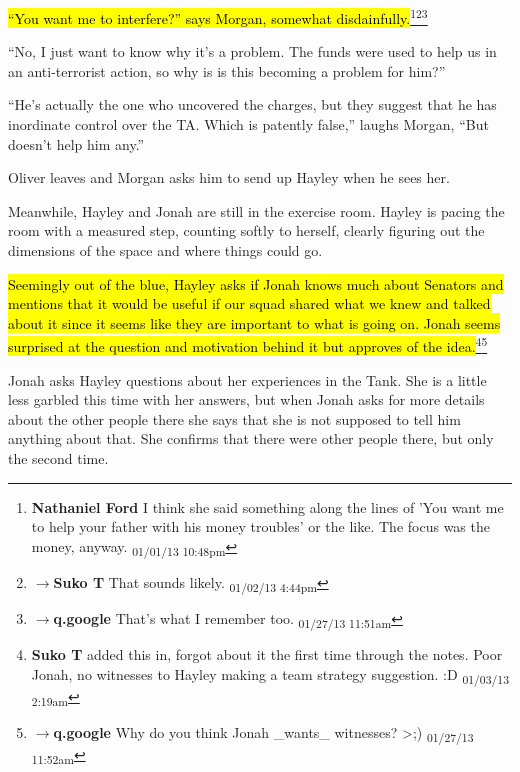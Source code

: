\hl{``You want me to interfere?'' says Morgan, somewhat disdainfully.}\footnote{\textbf{Nathaniel Ford }I think she said something along the lines of 'You want me to help your father with his money troubles' or the like. The focus was the money, anyway. \textsubscript{01/01/13 10:48pm}}\footnote{$\rightarrow$\textbf{Suko T }That sounds likely. \textsubscript{01/02/13 4:44pm}}\footnote{$\rightarrow$\textbf{q.google }That's what I remember too. \textsubscript{01/27/13 11:51am}}

``No, I just want to know why it's a problem.  The funds were used to help us in an anti-terrorist action, so why is is this becoming a problem for him?''

``He's actually the one who uncovered the charges, but they suggest that he has inordinate control over the TA.  Which is patently false,'' laughs Morgan, ``But doesn't help him any.''  



Oliver leaves and Morgan asks him to send up Hayley when he sees her.



Meanwhile, Hayley and Jonah are still in the exercise room.  Hayley is pacing the room with a measured step, counting softly to herself, clearly figuring out the dimensions of the space and where things could go.  



\hl{Seemingly out of the blue, Hayley asks if Jonah knows much about Senators and mentions that it would be useful if our squad shared what we knew and talked about it since it seems like they are important to what is going on.  Jonah seems surprised at the question and motivation behind it but approves of the idea.}\footnote{\textbf{Suko T }added this in, forgot about it the first time through the notes.  Poor Jonah, no witnesses to Hayley making a team strategy suggestion. :D \textsubscript{01/03/13 2:19am}}\footnote{$\rightarrow$\textbf{q.google }Why do you think Jonah \_wants\_ witnesses? \textgreater ;) \textsubscript{01/27/13 11:52am}}



Jonah asks Hayley questions about her experiences in the Tank.  She is a little less garbled this time with her answers, but when Jonah asks for more details about the other people there she says that she is not supposed to tell him anything about that.  She confirms that there were other people there, but only the second time.



